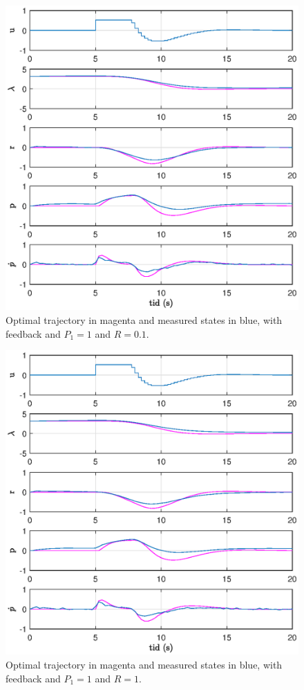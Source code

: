 \begin{figure}[h]
	\centering
	\includegraphics[width=\textwidth]{figures/plots/3_R=01.eps}
	\caption{Optimal trajectory in magenta and measured states in blue, with feedback and $P_1=1$ and $R=0.1$.}
\label{fig:3_r=0.1}
\end{figure}

\begin{figure}[h]
	\centering
	\includegraphics[width=\textwidth]{figures/plots/3_R=1.eps}
	\caption{Optimal trajectory in magenta and measured states in blue, with feedback and $P_1=1$ and $R=1$.}
\label{fig:3_r=1}
\end{figure}

